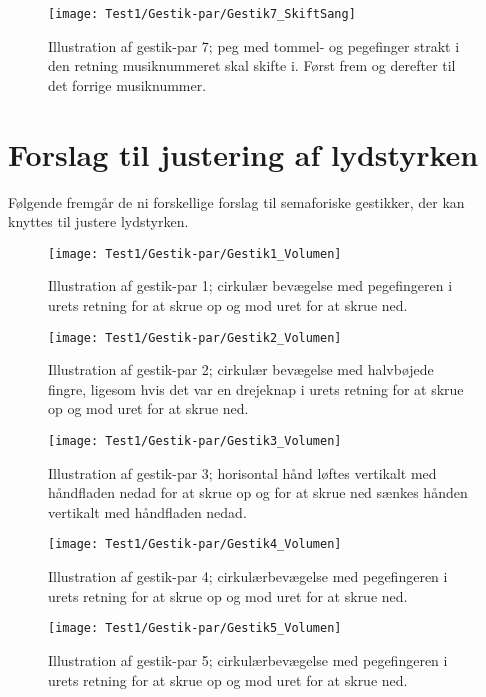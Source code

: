 \noindent
%
%
\begin{figure}[H]
	\centering
	\texttt{[image: Test1/Gestik-par/Gestik7\_SkiftSang]}
	\caption{Illustration af gestik-par 7; peg med tommel- og pegefinger strakt i den retning musiknummeret skal skifte i. Først frem og derefter til det forrige musiknummer.}
	\label{fig:GestikPar7SkiftApp}
\end{figure}
\noindent
%

\section{Forslag til justering af lydstyrken}
\label{app:ForslagVolumen}
%
Følgende fremgår de ni forskellige forslag til semaforiske gestikker, der kan knyttes til justere lydstyrken.
%
\begin{figure}[H]
	\centering
	\texttt{[image: Test1/Gestik-par/Gestik1\_Volumen]}
	\caption{Illustration af gestik-par 1; cirkulær bevægelse med pegefingeren i urets retning for at skrue op og mod uret for at skrue ned.}
	\label{fig:GestikPar1VolumenApp}
\end{figure}
\noindent
%
%
\begin{figure}[H]
	\centering
	\texttt{[image: Test1/Gestik-par/Gestik2\_Volumen]}
	\caption{Illustration af gestik-par 2; cirkulær bevægelse med halvbøjede fingre, ligesom hvis det var en drejeknap i urets retning for at skrue op og mod uret for at skrue ned.}
	\label{fig:GestikPar2VolumenApp}
\end{figure}
\noindent
%
%
\begin{figure}[H]
	\centering
	\texttt{[image: Test1/Gestik-par/Gestik3\_Volumen]}
	\caption{Illustration af gestik-par 3; horisontal hånd løftes vertikalt med håndfladen nedad for at skrue op og for at skrue ned sænkes hånden vertikalt med håndfladen nedad.}
	\label{fig:GestikPar3VolumenApp}
\end{figure}
\noindent
%
%
\begin{figure}[H]
	\centering
	\texttt{[image: Test1/Gestik-par/Gestik4\_Volumen]}
	\caption{Illustration af gestik-par 4; cirkulærbevægelse med pegefingeren i urets retning for at skrue op og mod uret for at skrue ned.}
	\label{fig:GestikPar4VolumenApp}
\end{figure}
\noindent
%
%
\begin{figure}[H]
	\centering
	\texttt{[image: Test1/Gestik-par/Gestik5\_Volumen]}
	\caption{Illustration af gestik-par 5; cirkulærbevægelse med pegefingeren i urets retning for at skrue op og mod uret for at skrue ned.}
	\label{fig:GestikPar5VolumenApp}
\end{figure}
